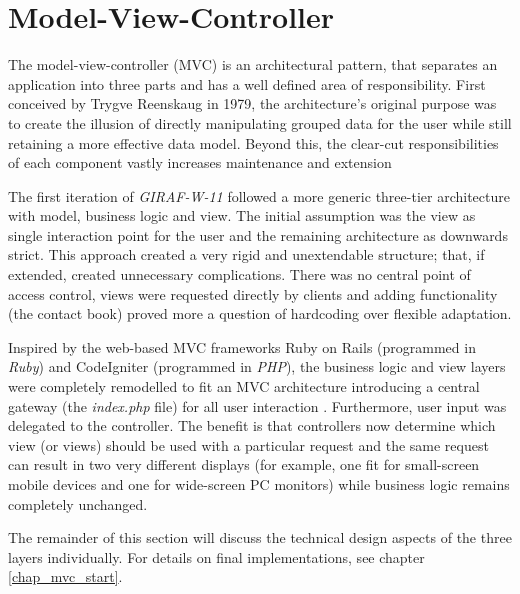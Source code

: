 \section{Model-View-Controller}
The model-view-controller (MVC) is an architectural pattern, that separates an application into three parts and has a well defined area of responsibility. First conceived by Trygve Reenskaug in 1979, the architecture's original purpose was to create the illusion of directly manipulating grouped data for the user while still retaining a more effective data model. Beyond this, the clear-cut responsibilities of each component vastly increases maintenance and extension \cite{reenskaug_mvc}

The first iteration of \emph{GIRAF-W-11} followed a more generic three-tier architecture with model, business logic and view. The initial assumption was the view as single interaction point for the user and the remaining architecture as downwards strict. This approach created a very rigid and unextendable structure; that, if extended, created unnecessary complications. There was no central point of access control, views were requested directly by clients and adding functionality (the contact book) proved more a question of hardcoding over flexible adaptation.

Inspired by the web-based MVC frameworks Ruby on Rails (programmed in \emph{Ruby}) and CodeIgniter (programmed in \emph{PHP}), the business logic and view layers were completely remodelled to fit an MVC architecture introducing a central gateway (the \emph{index.php} file) for all user interaction \cite{ci_mvc}\cite{ror_mvc}. Furthermore, user input was delegated to the controller. The benefit is that controllers now determine which view (or views) should be used with a particular request and the same request can result in two very different displays (for example, one fit for small-screen mobile devices and one for wide-screen PC monitors) while business logic remains completely unchanged.

The remainder of this section will discuss the technical design aspects of the three layers individually. For details on final implementations, see chapter \vref{chap_mvc_start}.

